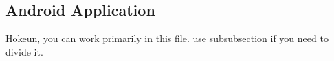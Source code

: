 \subsection{Android Application}
\label{sec:android-application}

Hokeun, you can work primarily in this file. use subsubsection if you need to divide it.

